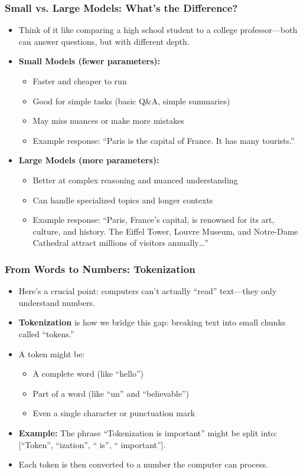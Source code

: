 \documentclass{beamer}
\begin{document}
\begin{frame}
    \frametitle{Small vs. Large Models: What's the Difference?}
    \begin{itemize}
        \item Think of it like comparing a high school student to a college professor—both can answer questions, but with different depth.
        \item \textbf{Small Models (fewer parameters):}
        \begin{itemize}
            \item Faster and cheaper to run
            \item Good for simple tasks (basic Q\&A, simple summaries)
            \item May miss nuances or make more mistakes
            \item Example response: ``Paris is the capital of France. It has many tourists.''
        \end{itemize}
        \item \textbf{Large Models (more parameters):}
        \begin{itemize}
            \item Better at complex reasoning and nuanced understanding
            \item Can handle specialized topics and longer contexts
            \item Example response: ``Paris, France's capital, is renowned for its art, culture, and history. The Eiffel Tower, Louvre Museum, and Notre-Dame Cathedral attract millions of visitors annually\ldots''
        \end{itemize}
    \end{itemize}
\end{frame}

\begin{frame}
    \frametitle{From Words to Numbers: Tokenization}
    \begin{itemize}
    \item Here's a crucial point: computers can't actually ``read'' text---they only understand numbers.
    \item \textbf{Tokenization} is how we bridge this gap: breaking text into small chunks called ``tokens.''
        \item A token might be:
        \begin{itemize}
            \item A complete word (like ``hello'')
            \item Part of a word (like ``un'' and ``believable'')
            \item Even a single character or punctuation mark
        \end{itemize}
    \item \textbf{Example:} The phrase ``Tokenization is important'' might be split into: [``Token'', ``ization'', `` is'', `` important''].
        \item Each token is then converted to a number the computer can process.
    \end{itemize}
\end{frame}
\end{document}
